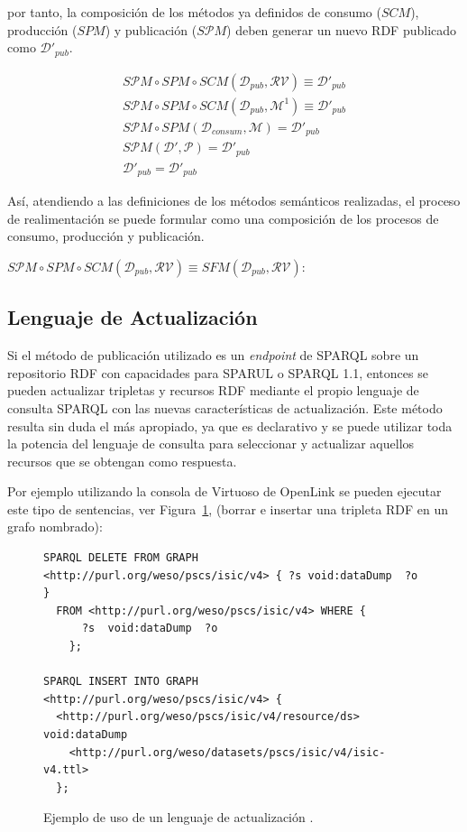 por tanto, la composición de los métodos ya definidos de consumo ($SCM$), producción ($SPM$) y publicación ($S\mathcal{P}M$) deben generar un
nuevo \dataset RDF publicado como $\mathcal{D}'_{pub}$.

\begin{align}
S\mathcal{P}M \circ SPM \circ SCM (\mathcal{D}_{pub}, \mathcal{RV}) \equiv \mathcal{D}'_{pub} \\
S\mathcal{P}M \circ SPM \circ SCM (\mathcal{D}_{pub}, \mathcal{M}^1) \equiv \mathcal{D}'_{pub} \\
S\mathcal{P}M \circ SPM (\mathcal{D}_{consum}, \mathcal{M}) = \mathcal{D}'_{pub} \\
S\mathcal{P}M (\mathcal{D}', \mathcal{P}) = \mathcal{D}'_{pub} \\
\mathcal{D}'_{pub} = \mathcal{D}'_{pub}
\end{align}

Así, atendiendo a las definiciones de los métodos semánticos realizadas, el proceso de realimentación
se puede formular como una composición de los procesos de consumo, producción y publicación.

\begin{center}
$S\mathcal{P}M \circ SPM \circ SCM (\mathcal{D}_{pub}, \mathcal{RV}) \equiv SFM (\mathcal{D}_{pub}, \mathcal{RV}) $:
\end{center}

\subsection{Lenguaje de Actualización}\label{sect:sparul}
Si el método de publicación utilizado es un \textit{endpoint} de SPARQL sobre
un repositorio RDF con capacidades para \gls{SPARUL} o \gls{SPARQL} 1.1, entonces
se pueden actualizar tripletas y recursos RDF mediante el propio lenguaje
de consulta SPARQL con las nuevas características de actualización. Este método
resulta sin duda el más apropiado, ya que es declarativo y se puede utilizar
toda la potencia del lenguaje de consulta para seleccionar y actualizar
aquellos recursos que se obtengan como respuesta.

Por ejemplo utilizando la consola de Virtuoso de OpenLink se pueden ejecutar
este tipo de sentencias, ver Figura~\ref{fig:sparul}, (borrar e insertar una tripleta RDF 
en un grafo nombrado):

\begin{figure}[!htp]
\begin{lstlisting}
SPARQL DELETE FROM GRAPH <http://purl.org/weso/pscs/isic/v4> { ?s void:dataDump  ?o }  
  FROM <http://purl.org/weso/pscs/isic/v4> WHERE {  
      ?s  void:dataDump  ?o  
    };

SPARQL INSERT INTO GRAPH <http://purl.org/weso/pscs/isic/v4> { 
  <http://purl.org/weso/pscs/isic/v4/resource/ds> void:dataDump 
    <http://purl.org/weso/datasets/pscs/isic/v4/isic-v4.ttl> 
  };
\end{lstlisting}
	\caption{Ejemplo de uso de un lenguaje de actualización .}
	\label{fig:sparul}
\end{figure}


